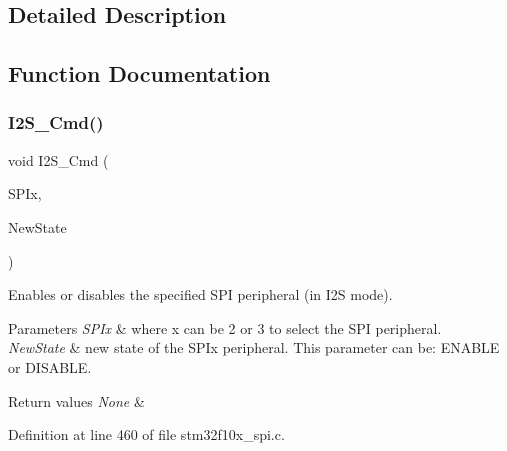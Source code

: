 \subsection{Detailed Description}


\subsection{Function Documentation}
\mbox{\label{group___s_p_i___exported___functions_gafe061c71bbc5b4224f3f2884dc53739e}} 
\subsubsection{\texorpdfstring{I2\+S\+\_\+\+Cmd()}{I2S\_Cmd()}}
{\footnotesize\ttfamily void I2\+S\+\_\+\+Cmd (\begin{DoxyParamCaption}\item[{\hyperlink{struct_s_p_i___type_def}{S\+P\+I\+\_\+\+Type\+Def} $\ast$}]{S\+P\+Ix,  }\item[{\hyperlink{group___exported__types_gac9a7e9a35d2513ec15c3b537aaa4fba1}{Functional\+State}}]{New\+State }\end{DoxyParamCaption})}



Enables or disables the specified S\+PI peripheral (in I2S mode). 


\begin{DoxyParams}{Parameters}
{\em S\+P\+Ix} & where x can be 2 or 3 to select the S\+PI peripheral. \\
\hline
{\em New\+State} & new state of the S\+P\+Ix peripheral. This parameter can be\+: E\+N\+A\+B\+LE or D\+I\+S\+A\+B\+LE. \\
\hline
\end{DoxyParams}

\begin{DoxyRetVals}{Return values}
{\em None} & \\
\hline
\end{DoxyRetVals}


Definition at line 460 of file stm32f10x\+\_\+spi.\+c.

\mbox{\label{group___s_p_i___exported___functions_ga53661884ae4a9640df7cbc59187782f7}} 

